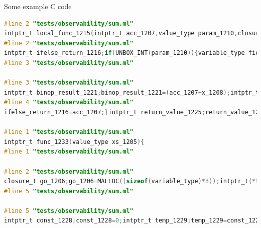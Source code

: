 \documentclass[pdf]{beamer}
\begin{document}
\begin{frame}[fragile]{Some example C code}
\begin{lstlisting}[breaklines=true, language=C,
keywordstyle=\color{keywords},
commentstyle=\color{comments},
stringstyle=\color{strings},
showstringspaces=false,
identifierstyle=\color{identifiers}]
#line 2 "tests/observability/sum.ml"
intptr_t local_func_1215(intptr_t acc_1207,value_type param_1210,closure_t closure_obj_1214){closure_t go_1206;go_1206=TO_CLOSURE(closure_obj_1214[(TO_INT(*(closure_obj_1214))-1)]);
#line 2 "tests/observability/sum.ml"
intptr_t ifelse_return_1216;if(UNBOX_INT(param_1210)){variable_type field_access_1217;field_access_1217=UNBOX_BLOCK(param_1210)[2];intptr_t let_return_1218;{{value_type xs_1209;xs_1209=TO_VALUE(field_access_1217);variable_type field_access_1219;field_access_1219=UNBOX_BLOCK(param_1210)[1];intptr_t let_return_1220;{{intptr_t x_1208;x_1208=TO_INT(field_access_1219);
#line 3 "tests/observability/sum.ml"

#line 3 "tests/observability/sum.ml"
intptr_t binop_result_1221;binop_result_1221=(acc_1207+x_1208);intptr_t temp_1222;temp_1222=binop_result_1221;value_type temp_1223;temp_1223=xs_1209;intptr_t apply_result_1224;apply_result_1224=((intptr_t(*)(intptr_t,value_type,closure_t))((intptr_t(*)(intptr_t,value_type,closure_t))TO_FUNC(go_1206[(TO_INT(*(go_1206))-0)])))(temp_1222,temp_1223,go_1206);let_return_1220=apply_result_1224;}}let_return_1218=let_return_1220;}}ifelse_return_1216=let_return_1218;}else{
#line 4 "tests/observability/sum.ml"
ifelse_return_1216=acc_1207;}intptr_t return_value_1225;return_value_1225=ifelse_return_1216;return return_value_1225;}

#line 1 "tests/observability/sum.ml"
intptr_t func_1233(value_type xs_1205){
#line 1 "tests/observability/sum.ml"

#line 2 "tests/observability/sum.ml"
closure_t go_1206;go_1206=MALLOC((sizeof(variable_type)*3));intptr_t(*temp_1226)(intptr_t,value_type,closure_t);temp_1226=&(local_func_1215);closure_t closure_obj_1227;closure_obj_1227=MALLOC((sizeof(variable_type)*3));closure_obj_1227[0]=FROM_INT(2);closure_obj_1227[1]=FROM_CLOSURE(go_1206);closure_obj_1227[2]=FROM_FUNC(temp_1226);MEMCPY(go_1206,closure_obj_1227,3);
#line 5 "tests/observability/sum.ml"

#line 5 "tests/observability/sum.ml"
intptr_t const_1228;const_1228=0;intptr_t temp_1229;temp_1229=const_1228;value_type temp_1230;temp_1230=xs_1205;intptr_t apply_result_1231;apply_result_1231=((intptr_t(*)(intptr_t,value_type,closure_t))((intptr_t(*)(intptr_t,value_type,closure_t))TO_FUNC(go_1206[(TO_INT(*(go_1206))-0)])))(temp_1229,temp_1230,go_1206);intptr_t return_value_1232;return_value_1232=apply_result_1231;return return_value_1232;}
\end{lstlisting}
\end{frame}
\end{document}
